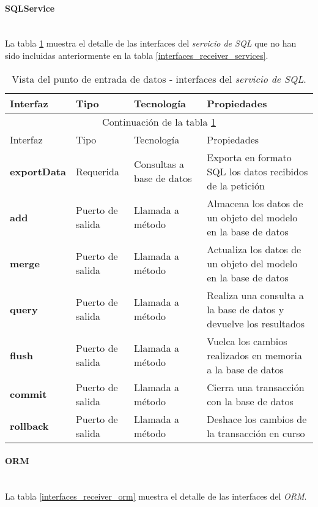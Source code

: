 \paragraph{SQLService} \hfill \\
La tabla \ref{interfaces_receiver_sqlservice} muestra el detalle de las interfaces del \textit{servicio de SQL} que no han sido incluidas anteriormente en la tabla \ref{interfaces_receiver_services}.  

\begin{longtable}[c]{|p{25mm}|p{20mm}|p{30mm}|p{60mm}|}
	\caption{Vista del punto de entrada de datos - interfaces del \textit{servicio de SQL}.\label{interfaces_receiver_sqlservice}}\\
		\hline
			Interfaz & Tipo & Tecnología & Propiedades\\
		\hline
		\hline
	\endfirsthead
		\hline
		\multicolumn{4}{|c|}{Continuación de la tabla \ref{interfaces_receiver_sqlservice}}\\
		\hline
			Interfaz & Tipo & Tecnología & Propiedades\\
		\hline
		\hline
	\endhead
	\hline
	\endfoot
		\textbf{exportData} & Requerida & Consultas a base de datos & Exporta en formato SQL los datos recibidos de la petición \\
		\hline
		\textbf{add} & Puerto de salida & Llamada a método & Almacena los datos de un objeto del modelo en la base de datos \\
		\hline
		\textbf{merge} & Puerto de salida & Llamada a método & Actualiza los datos de un objeto del modelo en la base de datos \\
		\hline
		\textbf{query} & Puerto de salida & Llamada a método & Realiza una consulta a la base de datos y devuelve los resultados\\
		\hline
		\textbf{flush} & Puerto de salida & Llamada a método & Vuelca los cambios realizados en memoria a la base de datos \\
		\hline
		\textbf{commit} & Puerto de salida & Llamada a método & Cierra una transacción con la base de datos \\
		\hline
		\textbf{rollback} & Puerto de salida & Llamada a método & Deshace los cambios de la transacción en curso\\
		\hline
	\hline
	\hline
\end{longtable}


\paragraph{ORM} \hfill \\
La tabla \ref{interfaces_receiver_orm} muestra el detalle de las interfaces del \textit{ORM}.  

